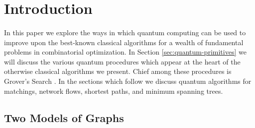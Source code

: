 \section{Introduction}
\paragraph{}
In this paper we explore the ways in which quantum computing can be used to improve upon the best-known classical algorithms for a wealth of fundamental problems in combinatorial optimization. In Section \ref{sec:quantum-primitives} we will discuss the various quantum procedures which appear at the heart of the otherwise classical algorithms we present. Chief among these procedures is Grover's Search \cite{grover1996fast}. In the sections which follow we discuss quantum algorithms for matchings, network flows, shortest paths, and minimum spanning trees.
\subsection{Two Models of Graphs}
